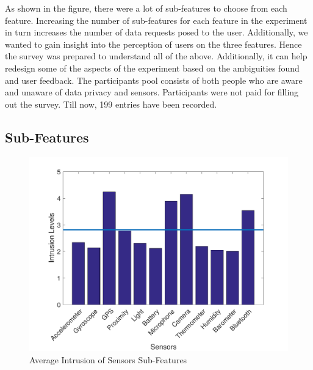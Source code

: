 As shown in the figure, there were a lot of sub-features to choose from each feature.
Increasing the number of sub-features for each feature in the experiment in turn increases the number of data requests posed to the user. Additionally,
we wanted to gain insight into the perception of users on the three features. Hence the survey
was prepared to understand all of the above. Additionally, it can help redesign some of the aspects of the experiment based on the
ambiguities found and user feedback. The participants pool consists of both people who are aware and unaware of data privacy and sensors. Participants were not paid for filling out the survey. Till now, 199 entries have been recorded.

\subsection{Sub-Features}

\begin{figure}[ht!]
\centering
\includegraphics[width=\textwidth,keepaspectratio]{./images/pre_se}
\caption{Average Intrusion of Sensors Sub-Features}
\label{fig:pre_se}
\end{figure}

